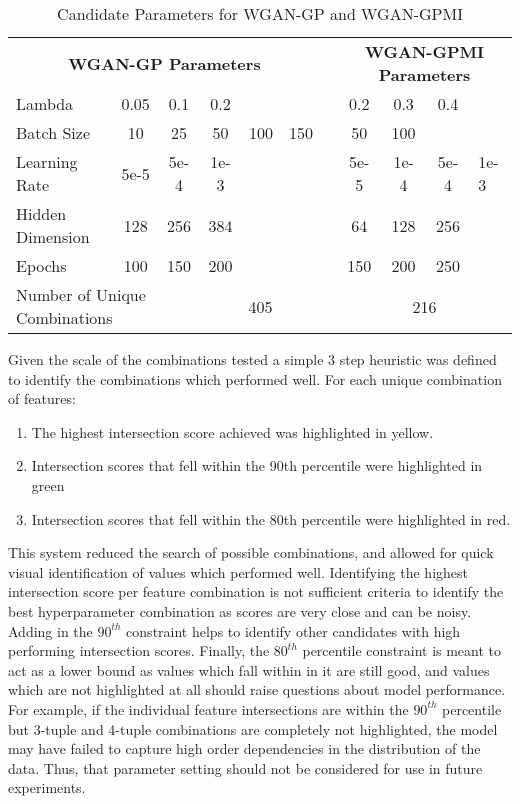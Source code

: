 \begin{table}[!htbp]
	\centering
	\caption{Candidate Parameters for WGAN-GP and WGAN-GPMI}
	\label{tab:param_sweep}
	\begin{tabular}{l|ccccc|l|cccl}
		\cline{1-11}
		\multicolumn{6}{c}{\textbf{WGAN-GP Parameters}} & \multicolumn{1}{l}{} & \multicolumn{4}{c}{\textbf{WGAN-GPMI Parameters}} \\
		\cline{1-11}
		Lambda & 0.05 & 0.1 & 0.2 & & & & 0.2 & 0.3 & 0.4 & \\
		Batch Size & 10 & 25 & 50 & 100 & 150 & & 50 & 100 &  & \\
		Learning Rate & 5e-5 & 5e-4 & 1e-3 & & & & 5e-5 & 1e-4 & 5e-4 & 1e-3 \\
		Hidden Dimension & 128 & 256 & 384 & & & & 64 & 128 & 256 & \\
		Epochs & 100 & 150 & 200 & & & & 150 & 200 & 250 & \\
		\cline{1-11}
		\multicolumn{3}{l|}{Number of Unique Combinations} & \multicolumn{3}{c}{405} & \multicolumn{1}{|l|}{} & \multicolumn{4}{c}{216} \\ \cline{1-11}
	\end{tabular}
\end{table}

Given the scale of the combinations tested a simple 3 step heuristic was defined to identify the combinations which performed well. For each unique combination of features:
\begin{enumerate}
	\item The highest intersection score achieved was highlighted in yellow.
	\item Intersection scores that fell within the 90th percentile were highlighted in green
	\item Intersection scores that fell within the 80th percentile were highlighted in red.
\end{enumerate}

This system reduced the search of possible combinations, and allowed for quick visual identification of values which performed well. Identifying the highest intersection score per feature combination is not sufficient criteria to identify the best hyperparameter combination as scores are very close and can be noisy. Adding in the $90^{th}$ constraint helps to identify other candidates with high performing intersection scores. Finally, the $80^{th}$ percentile constraint is meant to act as a lower bound as values which fall within in it are still good, and values which are not highlighted at all should raise questions about model performance. For example, if the individual feature intersections are within the $90^{th}$ percentile but 3-tuple and 4-tuple combinations are completely not highlighted, the model may have failed to capture high order dependencies in the distribution of the data. Thus, that parameter setting should not be considered for use in future experiments.

